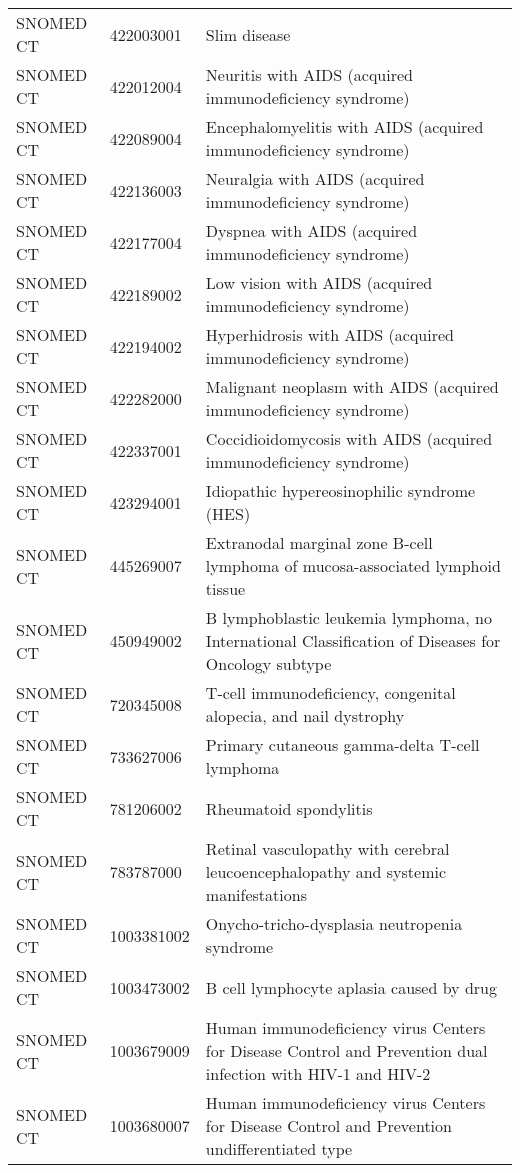 \begin{longtable}{p{}p{}p{}}
  SNOMED CT & 422003001 & Slim disease \\ 
  SNOMED CT & 422012004 & Neuritis with AIDS (acquired immunodeficiency syndrome) \\ 
  SNOMED CT & 422089004 & Encephalomyelitis with AIDS (acquired immunodeficiency syndrome) \\ 
  SNOMED CT & 422136003 & Neuralgia with AIDS (acquired immunodeficiency syndrome) \\ 
  SNOMED CT & 422177004 & Dyspnea with AIDS (acquired immunodeficiency syndrome) \\ 
  SNOMED CT & 422189002 & Low vision with AIDS (acquired immunodeficiency syndrome) \\ 
  SNOMED CT & 422194002 & Hyperhidrosis with AIDS (acquired immunodeficiency syndrome) \\ 
  SNOMED CT & 422282000 & Malignant neoplasm with AIDS (acquired immunodeficiency syndrome) \\ 
  SNOMED CT & 422337001 & Coccidioidomycosis with AIDS (acquired immunodeficiency syndrome) \\ 
  SNOMED CT & 423294001 & Idiopathic hypereosinophilic syndrome (HES) \\ 
  SNOMED CT & 445269007 & Extranodal marginal zone B-cell lymphoma of mucosa-associated lymphoid tissue \\ 
  SNOMED CT & 450949002 & B lymphoblastic leukemia lymphoma, no International Classification of Diseases for Oncology subtype \\ 
  SNOMED CT & 720345008 & T-cell immunodeficiency, congenital alopecia, and nail dystrophy \\ 
  SNOMED CT & 733627006 & Primary cutaneous gamma-delta T-cell lymphoma \\ 
  SNOMED CT & 781206002 & Rheumatoid spondylitis \\ 
  SNOMED CT & 783787000 & Retinal vasculopathy with cerebral leucoencephalopathy and systemic manifestations \\ 
  SNOMED CT & 1003381002 & Onycho-tricho-dysplasia neutropenia syndrome \\ 
  SNOMED CT & 1003473002 & B cell lymphocyte aplasia caused by drug \\ 
  SNOMED CT & 1003679009 & Human immunodeficiency virus Centers for Disease Control and Prevention dual infection with HIV-1 and HIV-2 \\ 
  SNOMED CT & 1003680007 & Human immunodeficiency virus Centers for Disease Control and Prevention undifferentiated type \\ 

\end{longtable}
